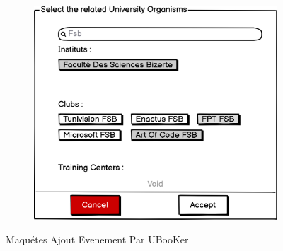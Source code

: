 \documentclass[12pt]{report}
\begin{document}
\begin{landscape}
\begin{figure}
\begin{subfigure}[b]{0.5\textwidth}
         \centering
         \includegraphics[width=\textwidth]{select university organisms}
     \end{subfigure}
     \caption{Maquétes Ajout Evenement Par UBooKer }
     \label{fig:maqutétes Ajout Evenement}
\end{figure}
\end{landscape}


\newpage
\end{document}
